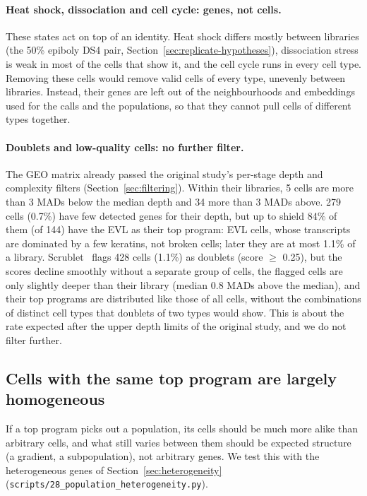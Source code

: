 \documentclass[11pt,a4paper]{article}
\begin{document}
\paragraph{Heat shock, dissociation and cell cycle: genes, not cells.} These states act on top of an identity. Heat shock differs mostly between libraries (the 50\% epiboly DS4 pair, Section~\ref{sec:replicate-hypotheses}), dissociation stress is weak in most of the cells that show it, and the cell cycle runs in every cell type. Removing these cells would remove valid cells of every type, unevenly between libraries. Instead, their genes are left out of the neighbourhoods and embeddings used for the calls and the populations, so that they cannot pull cells of different types together.

\paragraph{Doublets and low-quality cells: no further filter.} The GEO matrix already passed the original study's per-stage depth and complexity filters (Section~\ref{sec:filtering}). Within their libraries, 5 cells are more than 3 MADs below the median depth and 34 more than 3 MADs above. 279 cells (0.7\%) have few detected genes for their depth, but up to shield 84\% of them (of 144) have the EVL as their top program: EVL cells, whose transcripts are dominated by a few keratins, not broken cells; later they are at most 1.1\% of a library. Scrublet~\cite{wolock2019} flags 428 cells (1.1\%) as doublets (score $\geq$ 0.25), but the scores decline smoothly without a separate group of cells, the flagged cells are only slightly deeper than their library (median 0.8 MADs above the median), and their top programs are distributed like those of all cells, without the combinations of distinct cell types that doublets of two types would show. This is about the rate expected after the upper depth limits of the original study, and we do not filter further.

\subsection{Cells with the same top program are largely homogeneous}
\label{sec:population-heterogeneity}

If a top program picks out a population, its cells should be much more alike than arbitrary cells, and what still varies between them should be expected structure (a gradient, a subpopulation), not arbitrary genes. We test this with the heterogeneous genes of Section~\ref{sec:heterogeneity} (\nolinkurl{scripts/28_population_heterogeneity.py}).
\end{document}
